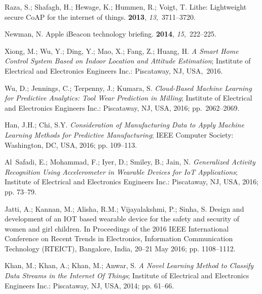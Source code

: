 \documentclass[symmetry,article,accept,moreauthors,pdftex10pt,a4paper]{mdpi}
\begin{document}
\begin{thebibliography}{999}
Raza, S.; Shafagh, H.; Hewage, K.; Hummen, R.; Voigt, T.
\newblock Lithe: Lightweight secure CoAP for the internet of things.
 {\bf 2013}, {\em 13},~3711--3720.

Newman, N.
\newblock Apple iBeacon technology briefing.
 {\bf
	2014}, {\em 15},~222--225.

Xiong, M.; Wu, Y.; Ding, Y.; Mao, X.; Fang, Z.; Huang, H.
\newblock \emph{A Smart Home Control System Based on Indoor Location and Attitude
	Estimation};
\newblock Institute of Electrical and Electronics Engineers Inc.: Piscataway, NJ, USA,~2016.

Wu, D.; Jennings, C.; Terpenny, J.; Kumara, S.
\newblock \emph{Cloud-Based Machine Learning for Predictive Analytics: Tool Wear
	Prediction in Milling};
\newblock Institute of Electrical and Electronics Engineers Inc.: Piscataway, NJ, USA, 2016; pp.~2062--2069.

Han, J.H.; Chi, S.Y.
\newblock \emph{Consideration of Manufacturing Data to Apply Machine Learning Methods
	for Predictive Manufacturing};
\newblock IEEE Computer Society: Washington, DC, USA, 2016; pp. 109--113.

Al~Safadi, E.; Mohammad, F.; Iyer, D.; Smiley, B.; Jain, N.
\newblock \emph{Generalized Activity Recognition Using Accelerometer in Wearable
	Devices for IoT Applications};
\newblock Institute of Electrical and Electronics Engineers Inc.: Piscataway, NJ, USA, 2016; pp.
73--79.

Jatti, A.; Kannan, M.; Alisha, R.M.; Vijayalakshmi, P.; Sinha, S.
\newblock Design and development of an IOT based wearable device for the safety
and security of women and girl children.
\newblock In Proceedings of the 2016 IEEE International Conference on Recent Trends in Electronics,
Information Communication Technology (RTEICT), Bangalore, India, 20--21 May 2016; pp. 1108--1112.

Khan, M.; Khan, A.; Khan, M.; Anwar, S.
\newblock \emph{A Novel Learning Method to Classify Data Streams in the Internet Of
	Things};
\newblock Institute of Electrical and Electronics Engineers Inc.: Piscataway, NJ, USA, 2014; pp.
61--66.


\end{thebibliography}
\end{document}
